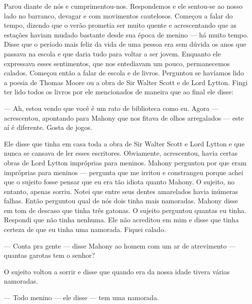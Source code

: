Parou diante de nós e cumprimentou-nos.  Respondemos e ele sentou-se ao nosso
lado no barranco, devagar e com movimentos cautelosos.  Começou a falar do
tempo, dizendo que o verão prometia ser muito quente e acrescentando que as
estações haviam mudado bastante desde sua época de menino --- há muito tempo.
Disse que o período mais feliz da vida de uma pessoa era sem dúvida os anos que
passava na escola e que daria tudo para voltar a ser jovem.  Enquanto ele
expressava esses sentimentos, que nos entediavam um pouco, permanecemos
calados.  Começou então a falar de escola e de livros.  Perguntou se havíamos
lido a poesia de Thomas Moore ou a obra de Sir Walter Scott e de Lord Lytton.
Fingi ter lido todos os livros por ele mencionados de maneira que ao final ele
disse:

--- Ah, estou vendo que você é um rato de biblioteca como eu.  Agora ---
acrescentou, apontando para Mahony que nos fitava de olhos arregalados --- este
aí é diferente.  Gosta de jogos.

Ele disse que tinha em casa toda a obra de Sir Walter Scott e Lord Lytton e que
nunca se cansava de ler esses escritores.  Obviamente, acrescentou, havia
certas obras de Lord Lytton impróprias para meninos.  Mahony perguntou por que
eram impróprias para meninos --- pergunta que me irritou e constrangeu porque
achei que o sujeito fosse pensar que eu era tão idiota quanto Mahony.  O
sujeito, no entanto, apenas sorriu.  Notei que entre seus dentes amarelados
havia inúmeras falhas.  Então perguntou qual de nós dois tinha mais namoradas.
Mahony disse em tom de descaso que tinha três gatonas.  O sujeito perguntou
quantas eu tinha.  Respondi que não tinha nenhuma.  Ele não acreditou em mim e
disse que tinha certeza de que eu tinha uma namorada.  Fiquei calado.

--- Conta pra gente --- disse Mahony ao homem com um ar de atrevimento ---
quantas garotas tem o senhor?

O sujeito voltou a sorrir e disse que quando era da nossa idade tivera várias
namoradas.

--- Todo menino --- ele disse --- tem uma namorada.

